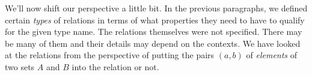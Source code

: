 



\medskip
\medskip
We'll now shift our perspective a little bit. In the previous paragraphs, we defined certain \emph{types} of relations in terms of what properties they need to have to qualify for the given type name. The relations themselves were not specified. There may be many of them and their details may depend on the contexts. We have looked at the relations from the perspective of putting the pairs $(a,b)$ of \emph{elements} of two sets $A$ and $B$ into the relation or not. 

